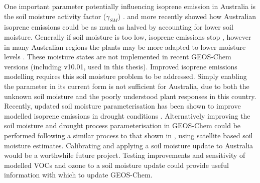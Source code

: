 {  %
  One important parameter potentially influencing isoprene emission in Australia is the soil moisture activity factor ($\gamma_{SM}$) \parencite{Sindelarova2014,Bauwens2016}.
  \textcite{Sindelarova2014} and more recently \textcite{Emmerson2019} showed how Australian isoprene emissions could be as much as halved by accounting for lower soil moisture.
  Generally if soil moisture is too low, isoprene emissions stop \parencite{Pegoraro2004,Niinemets2010}, however in many Australian regions the plants may be more adapted to lower moisture levels \parencite{Emmerson2019}.
  These moisture states are not implemented in recent GEOS-Chem versions (including v10.01, used in this thesis).
  Improved isoprene emissions modelling requires this soil moisture problem to be addressed.
  Simply enabling the parameter in its current form is not sufficient for Australia, due to both the unknown soil moisture and the poorly understood plant responses in this country.
  Recently, updated soil moisture parameterisation has been shown to improve modelled isoprene emissions in drought conditions \parencite{Jiang2018}.
  Alternatively improving the soil moisture and drought process parameterisation in GEOS-Chem could be performed following a similar process to that shown in \textcite{Emmerson2019}, using satellite based soil moisture estimates.
  Calibrating and applying a soil moisture update to Australia would be a worthwhile future project.
  Testing improvements and sensitivity of modelled VOCs and ozone to a soil moisture update could provide useful information with which to update GEOS-Chem.
  
}
